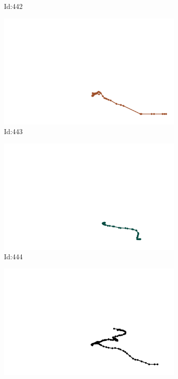 \documentclass[12pt,twoside]{report}
\begin{document}
\begin{figure}
\begin{subfigure}[b]{0.20\textwidth}
\caption{Id:442}
\end{subfigure}
\begin{subfigure}[b]{0.20\textwidth}
\centering
\includegraphics[width=\textwidth]{../trajectories/443.png}
\caption{Id:443}
\end{subfigure}
\begin{subfigure}[b]{0.20\textwidth}
\centering
\includegraphics[width=\textwidth]{../trajectories/444.png}
\caption{Id:444}
\end{subfigure}
\begin{subfigure}[b]{0.20\textwidth}
\centering
\includegraphics[width=\textwidth]{../trajectories/448.png}

\end{subfigure}
\end{figure}
\end{document}
